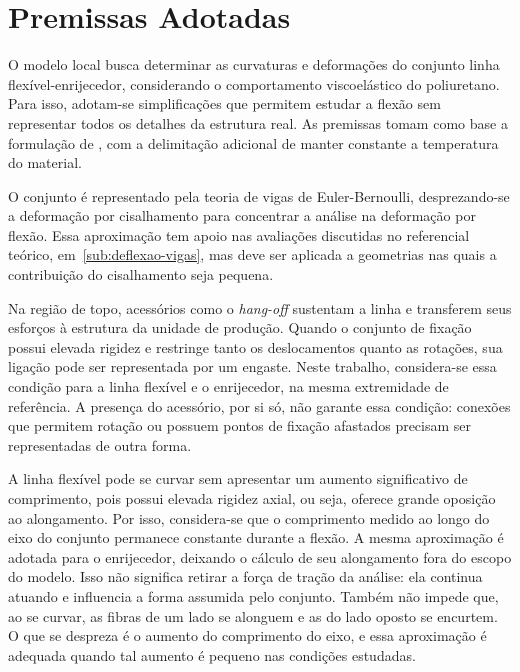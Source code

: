 \documentclass[arial,centeredequations,english,brazilian,oneside,section=TITLE]{ifes8}
\begin{document}
\section{Premissas Adotadas}
\label{sec:premissas-adotadas}

O modelo local busca determinar as curvaturas e deformações do conjunto linha flexível-enrijecedor,
considerando o comportamento viscoelástico do poliuretano. Para isso, adotam-se simplificações
que permitem estudar a flexão sem representar todos os detalhes da estrutura real. As premissas
tomam como base a formulação de , com a delimitação
adicional de manter constante a temperatura do material.

O conjunto é representado pela teoria de vigas de Euler-Bernoulli, desprezando-se a deformação
por cisalhamento para concentrar a análise na deformação por flexão. Essa aproximação tem
apoio nas avaliações discutidas no referencial teórico, em~\ref{sub:deflexao-vigas},
mas deve ser aplicada a geometrias nas quais a contribuição do cisalhamento seja pequena.

Na região de topo, acessórios como o \emph{hang-off} sustentam a linha e transferem seus
esforços à estrutura da unidade de produção. Quando o conjunto de fixação possui elevada
rigidez e restringe tanto os deslocamentos quanto as rotações, sua ligação pode ser
representada por um engaste. Neste trabalho, considera-se essa condição para a linha
flexível e o enrijecedor, na mesma extremidade de referência. A presença do acessório, por
si só, não garante essa condição: conexões que permitem rotação ou possuem pontos de fixação
afastados precisam ser representadas de outra forma.

A linha flexível pode se curvar sem apresentar um aumento significativo de comprimento,
pois possui elevada rigidez axial, ou seja, oferece grande oposição ao alongamento. Por isso, 
considera-se que o comprimento medido ao longo do eixo do conjunto permanece constante durante
a flexão. A mesma aproximação é adotada para o enrijecedor, deixando o cálculo de seu 
alongamento fora do escopo do modelo. Isso não significa retirar a força de tração da análise:
ela continua atuando e influencia a forma assumida pelo conjunto. Também não impede que, ao 
se curvar, as fibras de um lado se alonguem e as do lado oposto se encurtem. O que se despreza
é o aumento do comprimento do eixo, e essa aproximação é adequada quando tal aumento é pequeno
nas condições estudadas.
\end{document}
